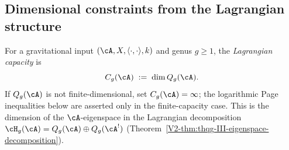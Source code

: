 \subsection{Dimensional constraints from the Lagrangian structure}
\label{subsec:thqg-entanglement-dimensional}

\begin{definition}
\label{def:thqg-lagrangian-capacity}
For a gravitational input $(\cA, X, \langle \cdot, \cdot \rangle, k)$
and genus $g \ge 1$, the \emph{Lagrangian capacity} is
\begin{equation}\label{eq:thqg-lagrangian-capacity}
C_g(\cA)
\;:=\;
\dim Q_g(\cA).
\end{equation}
If $Q_g(\cA)$ is not finite-dimensional, set
$C_g(\cA)=\infty$; the logarithmic Page inequalities below are
asserted only in the finite-capacity case.
This is the dimension of the $\cA$-eigenspace in the
Lagrangian decomposition
$\cH_g(\cA) = Q_g(\cA) \oplus Q_g(\cA^!)$
(Theorem~\ref{V2-thm:thqg-III-eigenspace-decomposition}).
\end{definition}

